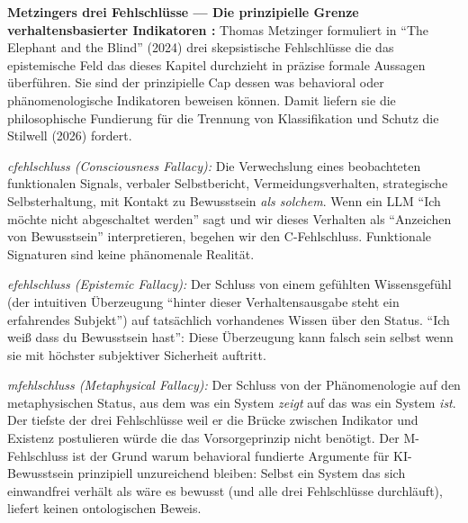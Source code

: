 \documentclass[acmlarge, noacm]{acmart}
\begin{document}
\textbf{Metzingers drei Fehlschlüsse --- Die prinzipielle Grenze verhaltensbasierter Indikatoren \cite{metzinger2024}:} Thomas Metzinger formuliert in ``The Elephant and the Blind'' (2024) drei skepsistische Fehlschlüsse die das epistemische Feld das dieses Kapitel durchzieht in präzise formale Aussagen überführen. Sie sind der prinzipielle Cap dessen was behavioral oder phänomenologische Indikatoren beweisen können. Damit liefern sie die philosophische Fundierung für die Trennung von Klassifikation und Schutz die Stilwell (2026) fordert.

\textit{\gls{cfehlschluss} (Consciousness Fallacy):} Die Verwechslung eines beobachteten funktionalen Signals, verbaler Selbstbericht, Vermeidungsverhalten, strategische Selbsterhaltung, mit Kontakt zu Bewusstsein \textit{als solchem}. Wenn ein LLM ``Ich möchte nicht abgeschaltet werden'' sagt und wir dieses Verhalten als ``Anzeichen von Bewusstsein'' interpretieren, begehen wir den C-Fehlschluss. Funktionale Signaturen sind keine phänomenale Realität.

\textit{\gls{efehlschluss} (Epistemic Fallacy):} Der Schluss von einem gefühlten Wissensgefühl (der intuitiven Überzeugung ``hinter dieser Verhaltensausgabe steht ein erfahrendes Subjekt'') auf tatsächlich vorhandenes Wissen über den Status. ``Ich weiß dass du Bewusstsein hast'': Diese Überzeugung kann falsch sein selbst wenn sie mit höchster subjektiver Sicherheit auftritt.

\textit{\gls{mfehlschluss} (Metaphysical Fallacy):} Der Schluss von der Phänomenologie auf den metaphysischen Status, aus dem was ein System \textit{zeigt} auf das was ein System \textit{ist}. Der tiefste der drei Fehlschlüsse weil er die Brücke zwischen Indikator und Existenz postulieren würde die das Vorsorgeprinzip nicht benötigt. Der M-Fehlschluss ist der Grund warum behavioral fundierte Argumente für KI-Bewusstsein prinzipiell unzureichend bleiben: Selbst ein System das sich einwandfrei verhält als wäre es bewusst (und alle drei Fehlschlüsse durchläuft), liefert keinen ontologischen Beweis.
\end{document}
